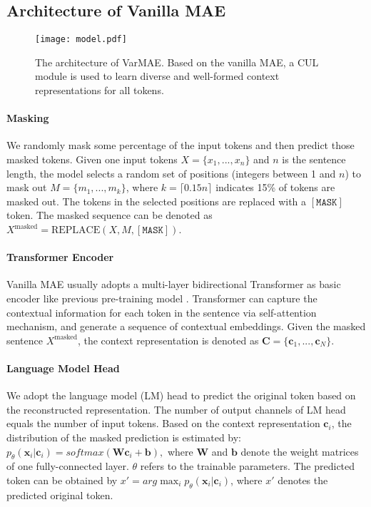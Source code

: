 \documentclass[11pt]{article}
\begin{document}
\subsection{Architecture of Vanilla MAE}

\begin{figure}[t]
    \centering
    \texttt{[image: model.pdf]} 
    \caption{The architecture of VarMAE. Based on the vanilla MAE, a CUL module is used to learn diverse and well-formed context representations for all tokens. }
    \label{fig:model}
\end{figure}
\paragraph{Masking}

We randomly mask some percentage of the input tokens and then predict those masked tokens.
Given one input tokens $X=\{x_1,...,x_n\}$ and $n$ is the sentence length, the model selects a random set of positions (integers between 1 and $n$) to mask out $M=\{m_1,...,m_k\}$, where $k=\lceil0.15n\rceil$ indicates 15\% of tokens are masked out.
The tokens in the selected positions are replaced with a $\mathtt{[MASK]}$ token. 
The masked sequence can be denoted as $X^{\text{masked}} = \text{REPLACE}(X, M, \mathtt{[MASK]})$.

\paragraph{Transformer Encoder}
{Vanilla MAE usually} adopts a multi-layer bidirectional Transformer \cite{DBLP:conf/nips/VaswaniSPUJGKP17} as basic encoder like previous pre-training model  \cite{DBLP:journals/corr/abs-1907-11692}.
Transformer can capture the contextual information for each token in the sentence via self-attention mechanism, and generate a sequence of contextual embeddings. Given the masked sentence $X^{\text{masked}}$, the context representation is denoted as $\mathbf{C}=\{\mathbf{c}_1,...,\mathbf{c}_N\}$.



\paragraph{Language Model Head}
We adopt the language model (LM) head to predict the original token based on the reconstructed representation. The number of output channels of LM head equals the number of input tokens. 
Based on the context representation $\mathbf{c}_i$, the distribution of the masked prediction is estimated by:
   $
   p_{\theta}(\mathbf{x}_i | \mathbf{c}_i) = softmax(\mathbf{W} \mathbf{c}_i + \mathbf{b}),
   $
where $\mathbf{W}$ and $\mathbf{b}$ denote the weight matrices of one fully-connected layer. $\theta$ refers to the trainable parameters.
The predicted token can be obtained by $x' = arg\max_i p_{\theta}(\mathbf{x}_i | \mathbf{c}_i)$, where $x'$ denotes the predicted original token.
\end{document}
